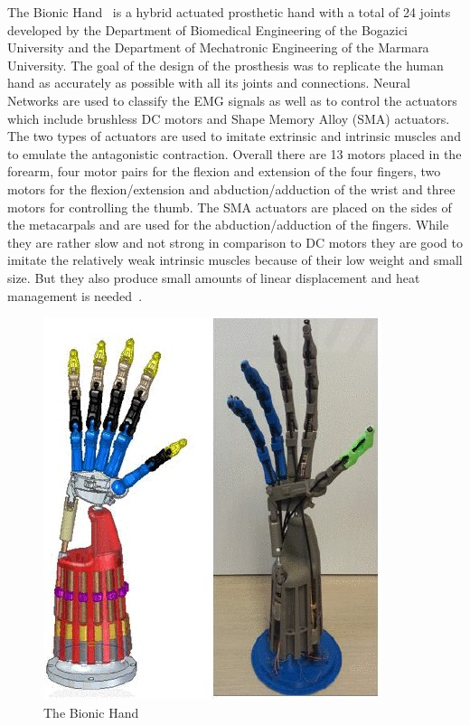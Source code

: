 \documentclass[a4paper, 10pt, conference]{ieeeconf}      %
\begin{document}
The Bionic Hand~\cite{bionichand} is a hybrid actuated prosthetic hand with a total of 24 joints developed by the Department of Biomedical Engineering of the Bogazici University and the Department of Mechatronic Engineering of the Marmara University. The goal of the design of the prosthesis was to replicate the human hand as accurately as possible with all its joints and connections. Neural Networks are used to classify the EMG signals as well as to control the actuators which include brushless DC motors and Shape Memory Alloy (SMA) actuators. The two types of actuators are used to imitate extrinsic and intrinsic muscles and to emulate the antagonistic contraction. Overall there are 13 motors placed in the forearm, four motor pairs for the flexion and extension of the four fingers, two motors for the flexion/extension and abduction/adduction of the wrist and three motors for controlling the thumb. The SMA actuators are placed on the sides of the metacarpals and are used for the abduction/adduction of the fingers. While they are rather slow and not strong in comparison to DC motors they are good to imitate the relatively weak intrinsic muscles because of their low weight and small size. But they also produce small amounts of linear displacement and heat management is needed~\cite{bundhoo}.

\begin{figure}[h]

	\centering
	\includegraphics[scale=0.6]{images/BionicHand}
	
	\caption{The Bionic Hand}
\end{figure}
\end{document}
